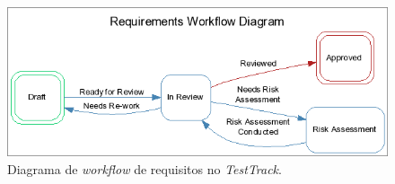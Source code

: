 \begin{itemize}
\begin{itemize}
	  \begin{figure}[!htbp]
	    \centering
	    \includegraphics[scale=0.65]{editaveis/figuras/workflow_testtrack}
	    \caption[Exemplo de um diagrama de workflow de requisitos no TestTrack]
		{Diagrama de \textit{workflow} de requisitos no \textit{TestTrack}. \footnotemark}
	    \label{workflow_testtrack}
	  \end{figure}
      \end{itemize}
	  
  \end{itemize}
 
 